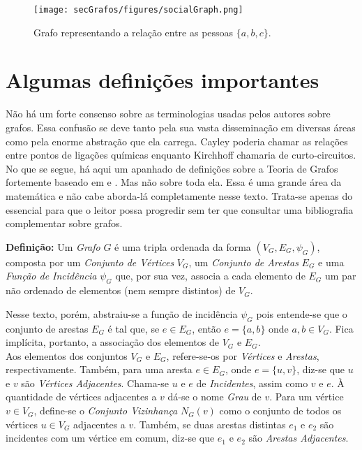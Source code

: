 \begin{figure}[H]
	\begin{center}
		\texttt{[image: secGrafos/figures/socialGraph.png]}
	\end{center}
	\caption{Grafo representando a relação entre as pessoas $\{a, b, c\}$.}
	\label{fig:socialGraph}
\end{figure}

\section*{Algumas definições importantes}

Não há um forte consenso sobre as terminologias usadas pelos autores sobre grafos. Essa confusão se deve tanto pela sua vasta disseminação em diversas áreas como pela enorme abstração que ela carrega. Cayley poderia chamar as relações entre pontos de ligações químicas enquanto Kirchhoff chamaria de curto-circuitos.
No que se segue, há aqui um apanhado de definições sobre a Teoria de Grafos fortemente baseado em \cite{graphTheoryFHarary} e \cite{graphTheoryApplicationsBondy}. Mas não sobre toda ela. Essa é uma grande área da matemática e não cabe aborda-lá completamente nesse texto. Trata-se apenas do essencial para que o leitor possa progredir sem ter que consultar uma bibliografia complementar sobre grafos.

\begin{center}
	\begin{minipage}{0.9 \linewidth}
		\textbf{Definição:} Um \textit{Grafo} $G$ é uma tripla ordenada da forma $(V_G,E_G, \psi_{G})$, composta por um \textit{Conjunto de Vértices} $V_G$, um \textit{Conjunto de Arestas} $E_G$ e uma \textit{Função de Incidência} $\psi_{G}$ que, por sua vez, associa a cada elemento de $E_G$ um par não ordenado de elementos (nem sempre distintos) de $V_G$.
	\end{minipage}
\end{center} 

Nesse texto, porém, abstraiu-se a função de incidência $\psi_G$ pois entende-se que o conjunto de arestas $E_G$ é tal que, se $e \in E_G$, então $e = \{a, b\}$ onde $a, b \in V_G$. Fica implícita, portanto, a associação dos elementos de  $V_G$ e $E_G$.
\\

Aos elementos dos conjuntos $V_G$ e $E_G$, refere-se-os por \textit{Vértices} e \textit{Arestas}, respectivamente. Também, para uma aresta $e \in E_G$, onde $e = \{u, v\}$, diz-se que $u$ e $v$ são \textit{Vértices Adjacentes}. Chama-se $u$ e $e$ de \textit{Incidentes}, assim como $v$ e $e$. À quantidade de vértices adjacentes a $v$ dá-se o nome \textit{Grau} de $v$. Para um vértice $v\in V_G$, define-se o \textit{Conjunto Vizinhança} $N_G(v)$ como o conjunto de todos os vértices $u\in V_G$ adjacentes a $v$. Também, se duas arestas distintas $e_1$ e $e_2$ são incidentes com um vértice em comum, diz-se que $e_1$ e $e_2$ são \textit{Arestas Adjacentes}. 
\\


